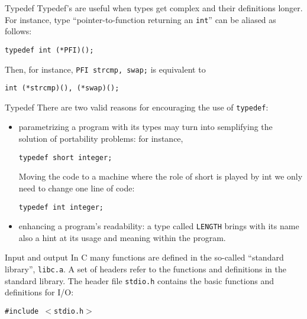 \begin{frame}[fragile]{Typedef}
Typedef's are useful when types get complex and their
definitions longer. For instance,
type ``pointer-to-function returning an {\tt int}'' can be
aliased as follows:
\begin{center}\tt typedef int (*PFI)();\end{center}


\vspace{20pt}

Then, for instance, {\tt PFI strcmp, swap;} is equivalent to
\begin{center}\tt int (*strcmp)(), (*swap)();\end{center}



\end{frame}
\begin{frame}[fragile]{Typedef}
There are two valid reasons for encouraging the use of
{\tt typedef}:
\begin{itemize}
\item parametrizing a program with its types may turn into semplifying
the solution of portability problems:
for instance,
\begin{center}\tt typedef short integer;\end{center}
Moving the code to a machine where the role of short is played by int
we only need to change one line of code:
\begin{center}\tt typedef int integer;\end{center}
\item enhancing a program's readability: a type called {\tt LENGTH} brings
with its name also a hint at its usage and meaning within the program.
\end{itemize}


\end{frame}
\begin{frame}[fragile]{Input and output}
In C many functions are defined in the so-called ``standard library'',
\verb"libc.a". A set of headers refer to the functions
and definitions in the standard library. The header file
\verb"stdio.h" contains the basic functions and definitions for I/O:
\begin{center}\tt \#include $<$stdio.h$>$\end{center}


\end{frame}
